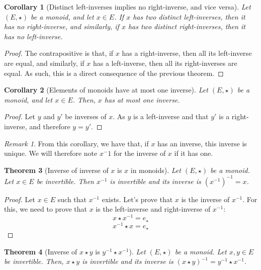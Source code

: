 \documentclass{article}
\newtheorem{theorem}{Theorem}[section]
\newtheorem{corollary}[theorem]{Corollary}
\theoremstyle{definition}
\theoremstyle{remark}
\newtheorem*{remark}{Remark}
\theoremstyle{example}
\begin{document}
\begin{corollary}[Distinct left-inverses implies no right-inverse, and vice versa]
		Let $(E, \star)$ be a monoid, and let $x \in E$. If $x$ has two distinct left-inverses, then it has no right-inverse, and similarly, if $x$ has two distinct right-inverses, then it has no left-inverse.
\end{corollary}

\begin{proof}
		The contrapositive is that, if $x$ has a right-inverse, then all its left-inverse are equal, and similarly, if $x$ has a left-inverse, then all its right-inverses are equal. As such, this is a direct consequence of the previous theorem.
\end{proof}

\begin{corollary}[Elements of monoids have at most one inverse] \label{thm:inv-unique}
		Let $(E, \star)$ be a monoid, and let $x \in E$. Then, $x$ has at most one inverse.
\end{corollary}

\begin{proof}
		Let $y$ and $y'$ be inverses of $x$. As $y$ is a left-inverse and that $y'$ is a right-inverse, and therefore $y = y'$.
\end{proof}

\begin{remark}
		From this corollary, we have that, if $x$ has an inverse, this inverse is unique. We will therefore note $x^-1$ for the inverse of $x$ if it has one.
\end{remark}

\begin{theorem}[Inverse of inverse of $x$ is $x$ in monoids] \label{thm:inv-inv}
		Let $(E, \star)$ be a monoid. Let $x \in E$ be invertible. Then $x^{-1}$ is invertible and its inverse is $(x^{-1})^{-1} = x$.
\end{theorem}

\begin{proof}
		Let $x \in E$ such that $x^{-1}$ exists. Let's prove that $x$ is the inverse of $x^{-1}$. For this, we need to prove that $x$ is the left-inverse and right-inverse of $x^{-1}$:
				$$x \star x^{-1} = e_\star$$
				$$x^{-1} \star x = e_\star$$
\end{proof}

\begin{theorem}[Inverse of $x \star y$ is $y^{-1} \star x^{-1}$] \label{thm:inv-distrib}
		Let $(E, \star)$ be a monoid. Let $x, y \in E$ be invertible. Then, $x \star y$ is invertible and its inverse is $(x \star y)^{-1} = y^{-1} \star x^{-1}$.
\end{theorem}
\end{document}
